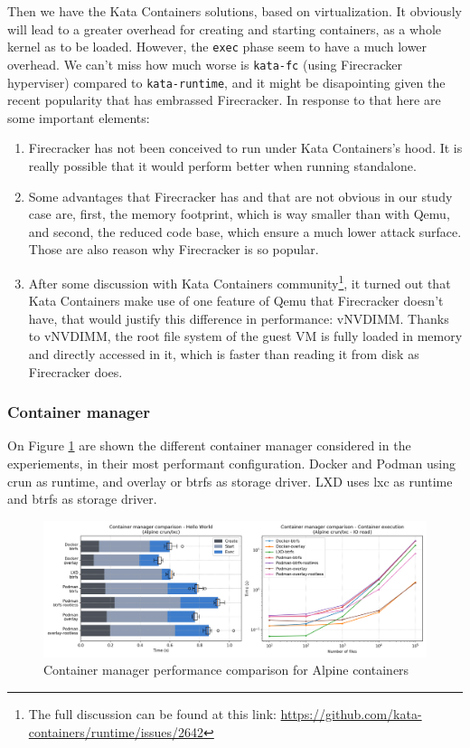 Then we have the Kata Containers solutions, based on virtualization.  It obviously will lead to a greater overhead for creating and starting containers, as a whole kernel as to be loaded.  However, the \texttt{exec} phase seem to have a much lower overhead.  We can't miss how much worse is \texttt{kata-fc} (using Firecracker hyperviser) compared to \texttt{kata-runtime}, and it might be disapointing given the recent popularity that has embrassed Firecracker.  In response to that here are some important elements:
\begin{enumerate}
  \item Firecracker has not been conceived to run under Kata Containers's hood.  It is really possible that it would perform better when running standalone.
  \item Some advantages that Firecracker has and that are not obvious in our study case are, first, the memory footprint, which is way smaller than with Qemu, and second, the reduced code base, which ensure a much lower attack surface.  Those are also reason why Firecracker is so popular.
  \item After some discussion with Kata Containers community\footnote{The full discussion can be found at this link: \href{https://github.com/kata-containers/runtime/issues/2642}{https://github.com/kata-containers/runtime/issues/2642}}, it turned out that Kata Containers make use of one feature of Qemu that Firecracker doesn't have, that would justify this difference in performance: vNVDIMM.  Thanks to vNVDIMM, the root file system of the guest VM is fully loaded in memory and directly accessed in it, which is faster than reading it from disk as Firecracker does.
\end{enumerate}

\subsubsection{Container manager}

On Figure \ref{fig:q1:manager} are shown the different container manager considered in the experiements, in their most performant configuration.  Docker and Podman using crun as runtime, and overlay or btrfs as storage driver.  LXD uses lxc as runtime and btrfs as storage driver.

\begin{figure}[h!]
  \begin{center}
    \includegraphics[width=\linewidth]{images/question-1-manager.png}
    \caption{Container manager performance comparison for Alpine containers}
    \label{fig:q1:manager}
  \end{center}
\end{figure}

